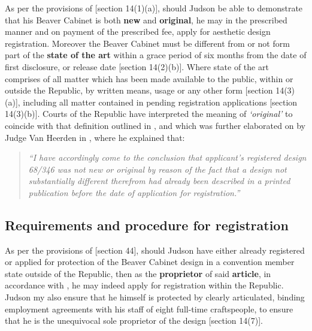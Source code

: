 \documentclass[11pt]{article}
\begin{document}
As per the provisions of [section 14(1)(a)]\cite{rsa93_designs_act}, should Judson
be able to demonstrate that his Beaver Cabinet is both \textbf{new} and \textbf{original}, he
may in the prescribed manner and on payment of the prescribed fee, apply for
aesthetic design registration. Moreover the Beaver Cabinet must be different
from or not form part of the \textbf{state of the art} within a grace period of six
months from the date of first disclosure, or release date [section
14(2)(b)]\cite{rsa93_designs_act}. Where state of the art comprises of all matter
which has been made available to the public, within or outside the Republic, by
written means, usage or any other form [section 14(3)(a)]\cite{rsa93_designs_act},
including all matter contained in pending registration applications [section
14(3)(b)]\cite{rsa93_designs_act}. Courts of the Republic have interpreted the
meaning of \emph{`original'} to coincide with that definition outlined in
\cite{rsa78_copyrightact}, and which was further elaborated on by Judge Van
Heerden in , where he
explained that:
\begin{quote}
\textit{``I have accordingly come to the conclusion that applicant's registered design
68/346 was not new or original by reason of the fact that a design not substantially
different therefrom had already been described in a printed publication before the
date of application for registration.''}
\end{quote}

\subsection{Requirements and procedure for registration}
\label{sec:orgb1fbd5a}
As per the provisions of [section 44]\cite{rsa93_designs_act}, should Judson have
either already registered or applied for protection of the Beaver Cabinet design
in a convention member state outside of the Republic, then as the \textbf{proprietor}
of said \textbf{article}, in accordance with \cite{rsa93_designs_act}, he may indeed
apply for registration within the Republic. Judson my also ensure that he
himself is protected by clearly articulated, binding employment agreements with
his staff of eight full-time craftspeople, to ensure that he is the unequivocal
sole proprietor of the design [section 14(7)]\cite{rsa93_designs_act}.\\
\end{document}
